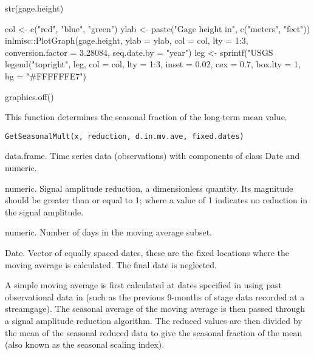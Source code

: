\documentclass[a4paper]{book}
\begin{document}
%
\begin{Examples}
\begin{ExampleCode}
str(gage.height)

col <- c("red", "blue", "green")
ylab <- paste("Gage height in", c("meters", "feet"))
inlmisc::PlotGraph(gage.height, ylab = ylab, col = col, lty = 1:3,
                   conversion.factor = 3.28084, seq.date.by = "year")
leg <- sprintf("USGS %
legend("topright", leg, col = col, lty = 1:3, inset = 0.02, cex = 0.7,
       box.lty = 1, bg = "#FFFFFFE7")

graphics.off()

\end{ExampleCode}
\end{Examples}
%
\begin{Description}\relax
This function determines the seasonal fraction of the long-term mean value.
\end{Description}
%
\begin{Usage}
\begin{verbatim}
GetSeasonalMult(x, reduction, d.in.mv.ave, fixed.dates)
\end{verbatim}
\end{Usage}
%
\begin{Arguments}
\begin{ldescription}
\item[\code{x}] data.frame.
Time series data (observations) with components of class Date and numeric.

\item[\code{reduction}] numeric.
Signal amplitude reduction, a dimensionless quantity.
Its magnitude should be greater than or equal to 1;
where a value of 1 indicates no reduction in the signal amplitude.

\item[\code{d.in.mv.ave}] numeric.
Number of days in the moving average subset.

\item[\code{fixed.dates}] Date.
Vector of equally spaced dates, these are the fixed locations where the moving average is calculated.
The final date is neglected.
\end{ldescription}
\end{Arguments}
%
\begin{Details}\relax
A simple moving average is first calculated at dates specified in 
using past observational data in 
(such as the previous 9-months of stage data recorded at a streamgage).
The seasonal average of the moving average is then passed through a signal amplitude reduction algorithm.
The reduced values are then divided by the mean of the seasonal reduced data to give
the seasonal fraction of the mean (also known as the seasonal scaling index).
\end{Details}
\end{document}
